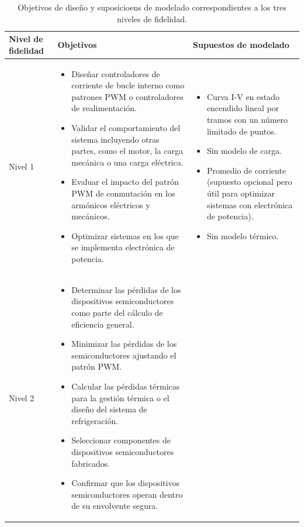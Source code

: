 \begin{longtable}{|l|p{5.8cm}|p{5.8cm}|}
    \caption{Objetivos de diseño y suposicioens de modelado correspondientes a los tres niveles de fidelidad. \cite{mathworks_choose_semiconductor}}
    \label{tab:niveles_fidelidad} \\

    \hline
    \textbf{Nivel de fidelidad} & \textbf{Objetivos} & \textbf{Supuestos de modelado} \\
    \hline
    \endhead %

    Nivel 1 & 
    \begin{itemize}
        \item Diseñar controladores de corriente de bucle interno como patrones PWM o controladores de realimentación.
        \item Validar el comportamiento del sistema incluyendo otras partes, como el motor, la carga mecánica o una carga eléctrica.
        \item Evaluar el impacto del patrón PWM de conmutación en los armónicos eléctricos y mecánicos.
        \item Optimizar sistemas en los que se implementa electrónica de potencia.
    \end{itemize} & 
    \begin{itemize}
        \item Curva I-V en estado encendido lineal por tramos con un número limitado de puntos.
        \item Sin modelo de carga.
        \item Promedio de corriente (supuesto opcional pero útil para optimizar sistemas con electrónica de potencia).
        \item Sin modelo térmico.
    \end{itemize} \\
    \hline
    Nivel 2 & 
    \begin{itemize}
        \item Determinar las pérdidas de los dispositivos semiconductores como parte del cálculo de eficiencia general.
        \item Minimizar las pérdidas de los semiconductores ajustando el patrón PWM.
        \item Calcular las pérdidas térmicas para la gestión térmica o el diseño del sistema de refrigeración.
        \item Seleccionar componentes de dispositivos semiconductores fabricados.
        \item Confirmar que los dispositivos semiconductores operan dentro de su envolvente segura.

\end{itemize}
\end{longtable}

